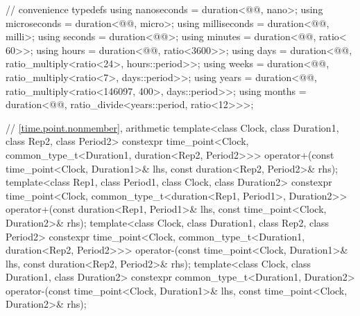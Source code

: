\begin{codeblock}
{  // convenience typedefs
  using nanoseconds  = duration<@@, nano>;
  using microseconds = duration<@@, micro>;
  using milliseconds = duration<@@, milli>;
  using seconds      = duration<@@>;
  using minutes      = duration<@@, ratio<  60>>;
  using hours        = duration<@@, ratio<3600>>;
  using days         = duration<@@,
                                ratio_multiply<ratio<24>, hours::period>>;
  using weeks        = duration<@@,
                                ratio_multiply<ratio<7>, days::period>>;
  using years        = duration<@@,
                                ratio_multiply<ratio<146097, 400>, days::period>>;
  using months       = duration<@@,
                                ratio_divide<years::period, ratio<12>>>;

  // \ref{time.point.nonmember},  arithmetic
  template<class Clock, class Duration1, class Rep2, class Period2>
    constexpr time_point<Clock, common_type_t<Duration1, duration<Rep2, Period2>>>
      operator+(const time_point<Clock, Duration1>& lhs, const duration<Rep2, Period2>& rhs);
  template<class Rep1, class Period1, class Clock, class Duration2>
    constexpr time_point<Clock, common_type_t<duration<Rep1, Period1>, Duration2>>
      operator+(const duration<Rep1, Period1>& lhs, const time_point<Clock, Duration2>& rhs);
  template<class Clock, class Duration1, class Rep2, class Period2>
    constexpr time_point<Clock, common_type_t<Duration1, duration<Rep2, Period2>>>
      operator-(const time_point<Clock, Duration1>& lhs, const duration<Rep2, Period2>& rhs);
  template<class Clock, class Duration1, class Duration2>
    constexpr common_type_t<Duration1, Duration2>
      operator-(const time_point<Clock, Duration1>& lhs,
                const time_point<Clock, Duration2>& rhs);

}
\end{codeblock}
